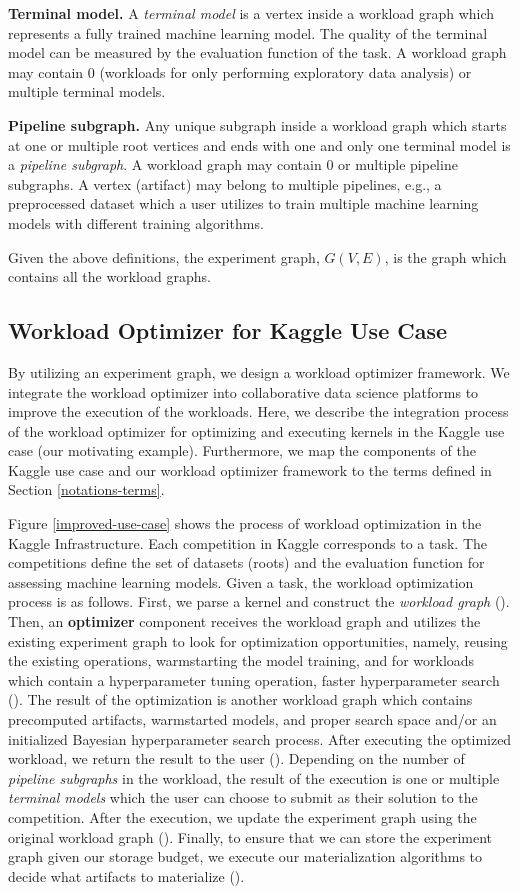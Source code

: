 \textbf{Terminal model.} A \textit{terminal model} is a vertex inside a workload graph which represents a fully trained machine learning model.
The quality of the terminal model can be measured by the evaluation function of the task.
A workload graph may contain $0$ (workloads for only performing exploratory data analysis) or multiple terminal models.

\textbf{Pipeline subgraph.} Any unique subgraph inside a workload graph which starts at one or multiple root vertices and ends with one and only one terminal model is a \textit{pipeline subgraph}.
A workload graph may contain $0$ or multiple pipeline subgraphs.
A vertex (artifact) may belong to multiple pipelines, e.g., a preprocessed dataset which a user utilizes to train multiple machine learning models with different training algorithms.

Given the above definitions, the experiment graph, $G(V, E)$, is the graph which contains all the workload graphs.

\subsection{Workload Optimizer for Kaggle Use Case}
By utilizing an experiment graph, we design a workload optimizer framework.
We integrate the workload optimizer into collaborative data science platforms to improve the execution of the workloads.
Here, we describe the integration process of the workload optimizer for optimizing and executing kernels in the Kaggle use case (our motivating example).
Furthermore, we map the components of the Kaggle use case and our workload optimizer framework to the terms defined in Section \ref{notations-terms}.

Figure \ref{improved-use-case} shows the process of workload optimization in the Kaggle Infrastructure.
Each competition in Kaggle corresponds to a task.
The competitions define the set of datasets (roots) and the evaluation function for assessing machine learning models. 
Given a task, the workload optimization process is as follows.
First, we parse a kernel and construct the \textit{workload graph} ().
Then, an \textbf{optimizer} component receives the workload graph and utilizes the existing experiment graph to look for optimization opportunities, namely, reusing the existing operations, warmstarting the model training, and for workloads which contain a hyperparameter tuning operation, faster hyperparameter search ().
The result of the optimization is another workload graph which contains precomputed artifacts, warmstarted models, and proper search space and/or an initialized Bayesian hyperparameter search process.
After executing the optimized workload, we return the result to the user ().
Depending on the number of \textit{pipeline subgraphs} in the workload, the result of the execution is one or multiple \textit{terminal models} which the user can choose to submit as their solution to the competition.
After the execution, we update the experiment graph using the original workload graph ().
Finally, to ensure that we can store the experiment graph given our storage budget, we execute our materialization algorithms to decide what artifacts to materialize ().

